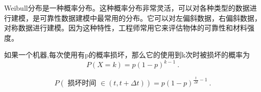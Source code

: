 
Weibull分布是一种概率分布。这种概率分布非常灵活，可以对各种类型的数据进行建模，是可靠性数据建模中最常用的分布。它可以对左偏斜数据，右偏斜数据，对称数据进行建模。因为这种特性，工程师常用它来评估物体的可靠性和材料强度。

如果一个机器,每次使用有p的概率损坏，那么它的使用到k次时被损坏的概率为
\begin{equation}
P(X=k)=p(1-p)^{k-1}~.
\end{equation}

\begin{equation}
P(\text { 损坏时间 } \in(t, t+\Delta t))=p(1-p)^{\frac{t}{\Delta t}-1}~.
\end{equation}